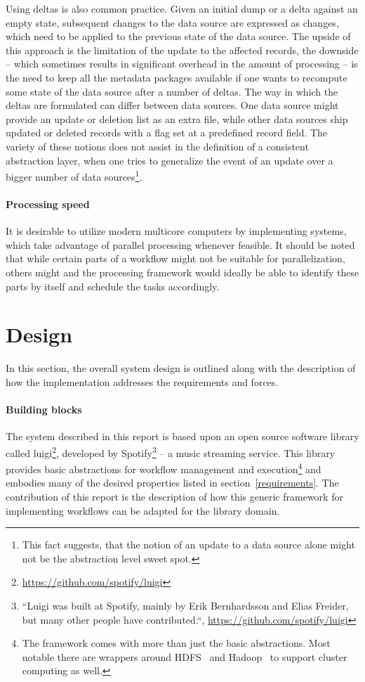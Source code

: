 \documentclass[english]{lni}
\begin{document}
Using deltas is also common practice. Given an initial dump or a delta against an empty state,
subsequent changes to the data source are expressed as changes, which
need to be applied to the previous state of the data source. The upside
of this approach is the limitation of the update to the affected
records, the downside -- which sometimes results in significant
overhead in the amount of processing -- is the need to keep all the metadata
packages available if one wants to recompute some state of the data
source after a number of deltas. The way in which the deltas are formulated can differ
between data sources. One data source might provide an
update or deletion list as an extra file, while other data sources
ship updated or deleted records with a flag set at a predefined record field. The
variety of these notions does not assist in the definition
of a consistent abstraction layer, when one tries to generalize the
event of an update over a bigger number of data sources\footnote{This fact suggests,
that the notion of an update to a data source alone might not be
the abstraction level sweet spot.}.

\paragraph{Processing speed}
It is desirable to utilize modern multicore
computers by implementing systems, which take advantage of parallel processing
whenever feasible. It should be noted that while certain parts of a workflow
might not be suitable for parallelization, others might and the processing
framework would ideally be able to identify these parts by itself
and schedule the tasks accordingly.

\section{Design}
\label{design}

In this section, the overall system design is outlined along with the
description of how the implementation addresses the requirements and forces.

\paragraph{Building blocks}

The system described in this report is based upon an open source software library called
luigi\footnote{\url{https://github.com/spotify/luigi}},
developed by Spotify\footnote{``Luigi was built at Spotify, mainly by Erik Bernhardsson and Elias Freider, but many other people have contributed.``, \url{https://github.com/spotify/luigi}} --
a music streaming service. This library provides
basic abstractions for workflow management and execution\footnote{The framework comes
with more than just the basic abstractions. Most notable there are wrappers around HDFS~\cite{borthakur2008hdfs} and
Hadoop~\cite{white2009hadoop} to support cluster computing as well.} and embodies many of
the desired properties listed in section~\ref{requirements}. The contribution
of this report is the description of how this generic framework for
implementing workflows can be adapted for the library domain.
\end{document}
